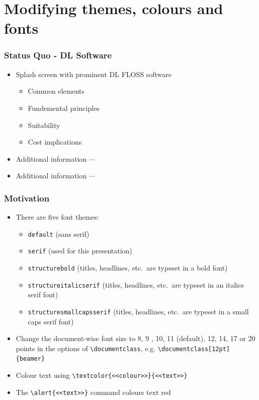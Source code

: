\documentclass[xcolor=pdftex,t,11pt]{beamer}
\begin{document}
\section{Modifying themes, colours and fonts}


\begin{frame}[fragile]
\frametitle{Status Quo - DL Software}
\begin{itemize}
\item Splash screen with prominent DL FLOSS software
\begin{itemize}
	\item Common elements
	\item Fundemental principles
	\item Suitability
	\item Cost implications
\end{itemize}
\item Additional information $\cdots$
\item Additional information $\cdots$
\end{itemize}
\end{frame}

\begin{frame}[fragile]
\frametitle{Motivation}
\begin{itemize}
\item There are five font themes: 
\begin{itemize}
	\item \verb!default! (sans serif)
	\item \verb!serif! (used for this presentation) 
	\item \verb!structurebold! (titles, headlines, etc.\ are typeset in a bold font)
	\item \verb!structureitalicserif! (titles, headlines, etc.\ are typeset in an italics serif font)
	\item \verb!structuresmallcapsserif! (titles, headlines, etc.\ are typeset in a small caps serif font)
\end{itemize}
\item Change the document-wise font size to 8, 9 , 10, 11 (default), 12, 14, 17 or 20 points in the options of \verb!\documentclass!, e.g. \verb!\documentclass[12pt]{beamer}!
\item Colour text using \verb!\textcolor{<<colour>>}{<<text>>}!
\item The \verb!\alert{<<text>>}! command colours text red
\end{itemize}
\end{frame}
\end{document}
